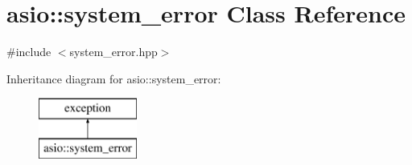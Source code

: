 \hypertarget{classasio_1_1system__error}{}\section{asio\+:\+:system\+\_\+error Class Reference}
\label{classasio_1_1system__error}


{\ttfamily \#include $<$system\+\_\+error.\+hpp$>$}

Inheritance diagram for asio\+:\+:system\+\_\+error\+:\begin{figure}[H]
\begin{center}
\leavevmode
\includegraphics[height=2.000000cm]{classasio_1_1system__error}
\end{center}
\end{figure}
